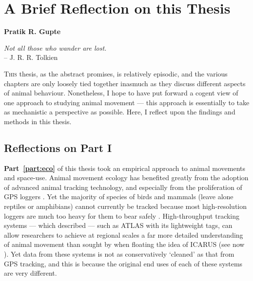 
%
\chapter{A Brief Reflection on this Thesis}\label{ch:discussion}

{\noindent \textbf{Pratik R. Gupte}}

\begin{center}
\emph{Not all those who wander are lost.}\\
\medskip
-- \small{J. R. R. Tolkien}
\end{center}

\lettrine{T}{his} thesis, as the abstract promises, is relatively episodic, and the various chapters are only loosely tied together inasmuch as they discuss different aspects of animal behaviour.
Nonetheless, I hope to have put forward a cogent view of one approach to studying animal movement --- this approach is essentially to take as mechanistic a perspective as possible.
Here, I reflect upon the findings and methods in this thesis.

\section*{Reflections on Part I}

\textbf{Part~\ref{part:eco}} of this thesis took an empirical approach to animal movements and space-use.
Animal movement ecology has benefited greatly from the adoption of advanced animal tracking technology, and especially from the proliferation of GPS loggers \citep{cagnacci2010}.
Yet the majority of species of birds and mammals (leave alone reptiles or amphibians) cannot currently be tracked because most high-resolution loggers are much too heavy for them to bear safely \parencite{kays2015}.
High-throughput tracking systems --- which \textcite{nathan2022} described --- such as ATLAS with its lightweight tags, can allow researchers to achieve at regional scales a far more detailed understanding of animal movement than sought by \textcite{wikelski2007} when floating the idea of ICARUS (see now \cite{jetz2022}).
Yet data from these systems is not as conservatively `cleaned' as that from GPS tracking, and this is because the original end uses of each of these systems are very different.

